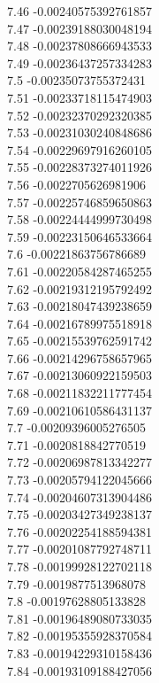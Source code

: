 {7.46	-0.00240575392761857\\
7.47	-0.00239188030048194\\
7.48	-0.00237808666943533\\
7.49	-0.00236437257334283\\
7.5	-0.00235073755372431\\
7.51	-0.00233718115474903\\
7.52	-0.00232370292320385\\
7.53	-0.00231030240848686\\
7.54	-0.00229697916260105\\
7.55	-0.00228373274011926\\
7.56	-0.0022705626981906\\
7.57	-0.00225746859650863\\
7.58	-0.00224444999730498\\
7.59	-0.00223150646533664\\
7.6	-0.00221863756786689\\
7.61	-0.00220584287465255\\
7.62	-0.00219312195792492\\
7.63	-0.00218047439238659\\
7.64	-0.00216789975518918\\
7.65	-0.00215539762591742\\
7.66	-0.00214296758657965\\
7.67	-0.00213060922159503\\
7.68	-0.00211832211777454\\
7.69	-0.00210610586431137\\
7.7	-0.00209396005276505\\
7.71	-0.0020818842770519\\
7.72	-0.00206987813342277\\
7.73	-0.00205794122045666\\
7.74	-0.00204607313904486\\
7.75	-0.00203427349238137\\
7.76	-0.00202254188594381\\
7.77	-0.00201087792748711\\
7.78	-0.00199928122702118\\
7.79	-0.0019877513968078\\
7.8	-0.00197628805133828\\
7.81	-0.00196489080733035\\
7.82	-0.00195355928370584\\
7.83	-0.00194229310158436\\
7.84	-0.00193109188427056\\
}
